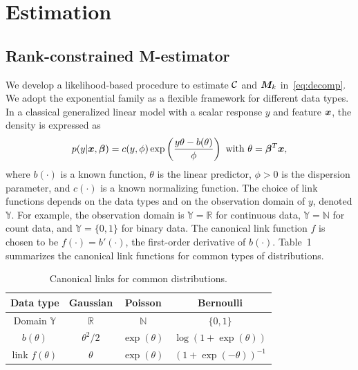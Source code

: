 \documentclass[12pt]{article}
\theoremstyle{definition}
\theoremstyle{definition}
\begin{document}
\section{Estimation}\label{sec:est}

\subsection{Rank-constrained M-estimator}
We develop a likelihood-based procedure to estimate $\mathcal{C}$ and $\bm M_k$ in~\eqref{eq:decomp}. We adopt the exponential family as a flexible framework for different data types. In a classical generalized linear model with a scalar response $y$ and feature $\bm x$, the density is expressed as
\[
p(y|\mx, \boldsymbol{\beta})=c(y,\phi)\exp\left(\frac{y\theta- b(\theta)}{\phi}\right)\ \text{with}\ \theta=\boldsymbol{\beta}^T\mx,
\]
where $b(\cdot)$ is a known function, $\theta$ is the linear predictor, $\phi>0$ is the dispersion parameter, and $c(\cdot)$ is a known normalizing function. The choice of link functions depends on the data types and on the observation domain of $y$, denoted $\mathbb{Y}$. For example, the observation domain is $\mathbb{Y}=\mathbb{R}$ for continuous data, $\mathbb{Y}=\mathbb{N}$ for count data, and  $\mathbb{Y}=\{0,1\}$ for binary data. The canonical link function $f$ is chosen to be $f(\cdot)=b'(\cdot)$, the first-order derivative of $b(\cdot)$. Table~1 summarizes the canonical link functions for common types of distributions. 

\begin{table}[htb]
\centering
\begin{tabular}{c|ccc}
Data type &Gaussian & Poisson& Bernoulli\\
\hline
Domain $\mathbb{Y}$& $\mathbb{R}$&$\mathbb{N}$&$\{0,1\}$\\
 $b(\theta)$&$\theta^2/2$& $\exp(\theta)$&$\log (1+\exp(\theta))$\\
 link $f(\theta)$&$\theta$&$\exp(\theta)$&$(1+\exp(-\theta))^{-1}$
\end{tabular}
\caption{Canonical links for common distributions.}\label{table:link}
\end{table}
\end{document}
